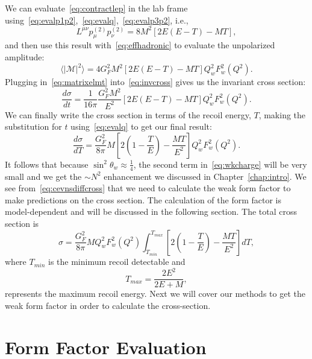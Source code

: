 We can evaluate~\eqref{eq:contractlep} in the lab frame using~\eqref{eq:evalp1p2},~\eqref{eq:evalq},~\eqref{eq:evalp3p2}, i.e.,
\begin{equation}
L^{\mu \nu}p_{\mu}^{(2)}p_{\nu}^{(2)} = 8M^2 \left[ 2E(E-T)-MT \right],
\end{equation}
and then use this result with~\eqref{eq:effhadronic} to evaluate the unpolarized amplitude:
\begin{equation}\label{eq:matrixelmt}
\langle |\mathcal{M}|^2 \rangle = 4G_F^2M^2 \left[ 2E(E-T)-MT \right] Q_{w}^2 F_{w}^2(Q^2).
\end{equation}
Plugging in~\eqref{eq:matrixelmt} into~\eqref{eq:invcross} gives us the invariant cross section:
\begin{equation}
\frac{d\sigma}{dt} = \frac{1}{16\pi} \frac{G_F^2M^2}{E^2}\left[ 2E(E-T)-MT \right] Q_{w}^2 F_{w}^2(Q^2).
\end{equation}
We can finally write the cross section in terms of the recoil energy, $T$, making the substitution for $t$ using~\eqref{eq:evalq} to get our final result:
\begin{equation}\label{eq:cevnsdiffcross}
\boxed{
\frac{d\sigma}{dT} = \frac{G_F^2}{8\pi}M \left[ 2\left(1-\frac{T}{E}\right) - \frac{MT}{E^2} \right] Q_{w}^2 F_{w}^2(Q^2)
}.
\end{equation}
It follows that because $ \sin^2\theta _w \approx \frac{1}{4} $, the second term in~\eqref{eq:wkcharge} will be very small and we get the $ \sim N^2 $ enhancement we discussed in Chapter~\ref{chap:intro}. We see from~\eqref{eq:cevnsdiffcross} that we need to calculate the weak form factor to make predictions on the cross section. The calculation of the form factor is model-dependent and will be discussed in the following section. The total cross section is
\begin{equation}\label{eq:totcross}
\boxed{
\sigma = \frac{G_F^2}{8\pi}M Q_{w}^2 F_{w}^2(Q^2) \int_{T_{min}}^{ T_{max}}\left[ 2 \left( 1- \frac{T}{E} \right) -\frac{MT}{E^2} \right] dT
},
\end{equation} 
where $T_{min}$ is the minimum recoil detectable and 
\begin{equation}
T_{max}=\frac{2E^2}{2E+M},
\end{equation}
represents the maximum recoil energy. Next we will cover our methods to get the weak form factor in order to calculate the cross-section. 

\section{Form Factor Evaluation}

